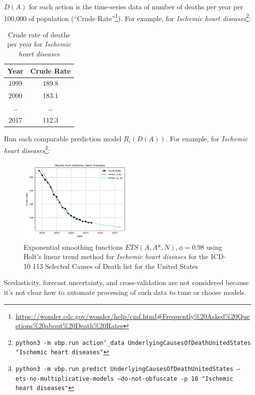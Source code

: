 \documentclass[12pt, a4paper, twocolumn]{article}
\begin{document}
$D(A)$ for each action is the time-series data of number of deaths per year per 100,000 of population (\enquote{Crude Rate}\footnote{\scriptsize{\url{https://wonder.cdc.gov/wonder/help/cmf.html\#Frequently\%20Asked\%20Questions\%20about\%20Death\%20Rates}}}). For example, for \textit{Ischemic heart diseases}\footnote{\texttt{python3 -m vbp.run action\char`_data UnderlyingCausesOfDeathUnitedStates "Ischemic heart diseases"}}:

\begin{table}[H]
  \centering
  \begin{tabular}{cc}
    \toprule
      Year   & Crude Rate \\
    \midrule
      1999   &      189.8 \\
      2000   &      183.1 \\
      \ldots &     \ldots \\
      2017   &      112.3 \\
    \bottomrule
  \end{tabular}
  \caption{Crude rate of deaths per year for \textit{Ischemic heart diseases}}
  \label{table:daa1}
\end{table}

Run each comparable prediction model $R_i(D(A))$. For example, for \textit{Ischemic heart diseases}\footnote{\texttt{python3 -m vbp.run predict UnderlyingCausesOfDeathUnitedStates --ets-no-multiplicative-models --do-not-obfuscate -p 10 "Ischemic heart diseases"}}:

\begin{figure}[H]
  \centering
  \includegraphics[width=0.5\textwidth]{results/UCOD_1999_2017_ICD10_113_CAUSES_LEAVES_Ischemic_heart_diseases_ets.png}
  \caption{Exponential smoothing functions $ETS(A,A*,N),\phi=0.98$ using Holt's linear trend method for \textit{Ischemic heart diseases} for the ICD-10 113 Selected Causes of Death list for the United States}\label{fig:neoplasmregs}
\end{figure}

Scedasticity, forecast uncertainty, and cross-validation are not considered because it's not clear how to automate processing of such data to tune or choose models.
\end{document}
